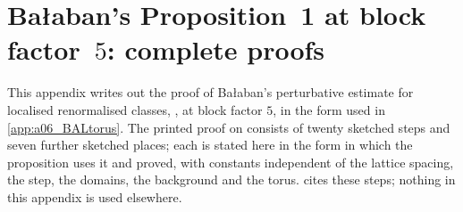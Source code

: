 
\section{Ba{\l}aban's Proposition~1 at block factor~$5$: complete proofs}\label{app:a08_balaban}

This appendix writes out the proof of Ba{\l}aban's perturbative estimate for localised renormalised classes, \cite[Prop.~1, (1.33)]{Ba3}, at block factor $5$, in the form used in \cref{app:a06_BALtorus}. The printed proof on \cite[pp.~420--445]{Ba3} consists of twenty sketched steps and seven further sketched places; each is stated here in the form in which the proposition uses it and proved, with constants independent of the lattice spacing, the step, the domains, the background and the torus.  cites these steps; nothing in this appendix is used elsewhere.


































